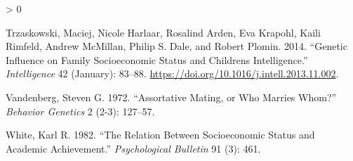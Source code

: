 \documentclass[
]{article}
\newlength{\cslhangindent}
\newenvironment{CSLReferences}[2] %
 {%
  \setlength{\parindent}{0pt}
  \ifodd #1 \everypar{\setlength{\hangindent}{\cslhangindent}}\ignorespaces\fi
  \ifnum #2 > 0
  \setlength{\parskip}{#2\baselineskip}
  \fi
 }%
 {}
\begin{document}
\begin{CSLReferences}{1}{0}
\leavevmode\hypertarget{ref-Trzaskowski_2014}{}%
Trzaskowski, Maciej, Nicole Harlaar, Rosalind Arden, Eva Krapohl, Kaili Rimfeld, Andrew McMillan, Philip S. Dale, and Robert Plomin. 2014. {``Genetic Influence on Family Socioeconomic Status and Children{{}}s Intelligence.''} \emph{Intelligence} 42 (January): 83--88. \url{https://doi.org/10.1016/j.intell.2013.11.002}.

\leavevmode\hypertarget{ref-vandenberg1972assortative}{}%
Vandenberg, Steven G. 1972. {``Assortative Mating, or Who Marries Whom?''} \emph{Behavior Genetics} 2 (2-3): 127--57.

\leavevmode\hypertarget{ref-white1982relation}{}%
White, Karl R. 1982. {``The Relation Between Socioeconomic Status and Academic Achievement.''} \emph{Psychological Bulletin} 91 (3): 461.

\end{CSLReferences}
\end{document}
